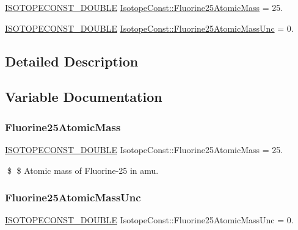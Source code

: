 \begin{DoxyCompactItemize}
\item 
\mbox{\hyperlink{group___isotope_const-_macros_ga8f45a7272ce02c0b4c65c44636ed719a}{I\+S\+O\+T\+O\+P\+E\+C\+O\+N\+S\+T\+\_\+\+D\+O\+U\+B\+LE}} \mbox{\hyperlink{group___isotope_const-_fluorine-_f25_gad487aad00691fc5bbe714d48fe5fd089}{Isotope\+Const\+::\+Fluorine25\+Atomic\+Mass}} = 25.
\item 
\mbox{\hyperlink{group___isotope_const-_macros_ga8f45a7272ce02c0b4c65c44636ed719a}{I\+S\+O\+T\+O\+P\+E\+C\+O\+N\+S\+T\+\_\+\+D\+O\+U\+B\+LE}} \mbox{\hyperlink{group___isotope_const-_fluorine-_f25_gaff28efa5879d500e17eb058b731cc768}{Isotope\+Const\+::\+Fluorine25\+Atomic\+Mass\+Unc}} = 0.
\end{DoxyCompactItemize}


\subsection{Detailed Description}


\subsection{Variable Documentation}
\mbox{\label{group___isotope_const-_fluorine-_f25_gad487aad00691fc5bbe714d48fe5fd089}} 
\subsubsection{\texorpdfstring{Fluorine25\+Atomic\+Mass}{Fluorine25AtomicMass}}
{\footnotesize\ttfamily \mbox{\hyperlink{group___isotope_const-_macros_ga8f45a7272ce02c0b4c65c44636ed719a}{I\+S\+O\+T\+O\+P\+E\+C\+O\+N\+S\+T\+\_\+\+D\+O\+U\+B\+LE}} Isotope\+Const\+::\+Fluorine25\+Atomic\+Mass = 25.}

\$ \$ Atomic mass of Fluorine-\/25 in amu. \mbox{\label{group___isotope_const-_fluorine-_f25_gaff28efa5879d500e17eb058b731cc768}} 
\subsubsection{\texorpdfstring{Fluorine25\+Atomic\+Mass\+Unc}{Fluorine25AtomicMassUnc}}
{\footnotesize\ttfamily \mbox{\hyperlink{group___isotope_const-_macros_ga8f45a7272ce02c0b4c65c44636ed719a}{I\+S\+O\+T\+O\+P\+E\+C\+O\+N\+S\+T\+\_\+\+D\+O\+U\+B\+LE}} Isotope\+Const\+::\+Fluorine25\+Atomic\+Mass\+Unc = 0.}


